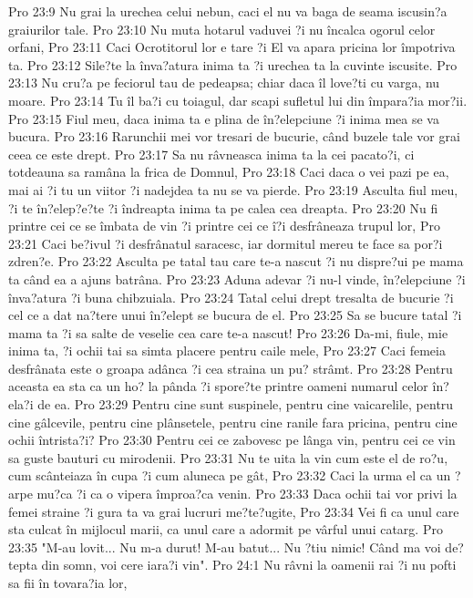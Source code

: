 Pro 23:9  Nu grai la urechea celui nebun, caci el nu va baga de seama iscusin?a graiurilor tale.
Pro 23:10  Nu muta hotarul vaduvei ?i nu încalca ogorul celor orfani,
Pro 23:11  Caci Ocrotitorul lor e tare ?i El va apara pricina lor împotriva ta.
Pro 23:12  Sile?te la înva?atura inima ta ?i urechea ta la cuvinte iscusite.
Pro 23:13  Nu cru?a pe feciorul tau de pedeapsa; chiar daca îl love?ti cu varga, nu moare.
Pro 23:14  Tu îl ba?i cu toiagul, dar scapi sufletul lui din împara?ia mor?ii.
Pro 23:15  Fiul meu, daca inima ta e plina de în?elepciune ?i inima mea se va bucura.
Pro 23:16  Rarunchii mei vor tresari de bucurie, când buzele tale vor grai ceea ce este drept.
Pro 23:17  Sa nu râvneasca inima ta la cei pacato?i, ci totdeauna sa ramâna la frica de Domnul,
Pro 23:18  Caci daca o vei pazi pe ea, mai ai ?i tu un viitor ?i nadejdea ta nu se va pierde.
Pro 23:19  Asculta fiul meu, ?i te în?elep?e?te ?i îndreapta inima ta pe calea cea dreapta.
Pro 23:20  Nu fi printre cei ce se îmbata de vin ?i printre cei ce î?i desfrâneaza trupul lor,
Pro 23:21  Caci be?ivul ?i desfrânatul saracesc, iar dormitul mereu te face sa por?i zdren?e.
Pro 23:22  Asculta pe tatal tau care te-a nascut ?i nu dispre?ui pe mama ta când ea a ajuns batrâna.
Pro 23:23  Aduna adevar ?i nu-l vinde, în?elepciune ?i înva?atura ?i buna chibzuiala.
Pro 23:24  Tatal celui drept tresalta de bucurie ?i cel ce a dat na?tere unui în?elept se bucura de el.
Pro 23:25  Sa se bucure tatal ?i mama ta ?i sa salte de veselie cea care te-a nascut!
Pro 23:26  Da-mi, fiule, mie inima ta, ?i ochii tai sa simta placere pentru caile mele,
Pro 23:27  Caci femeia desfrânata este o groapa adânca ?i cea straina un pu? strâmt.
Pro 23:28  Pentru aceasta ea sta ca un ho? la pânda ?i spore?te printre oameni numarul celor în?ela?i de ea.
Pro 23:29  Pentru cine sunt suspinele, pentru cine vaicarelile, pentru cine gâlcevile, pentru cine plânsetele, pentru cine ranile fara pricina, pentru cine ochii întrista?i?
Pro 23:30  Pentru cei ce zabovesc pe lânga vin, pentru cei ce vin sa guste bauturi cu mirodenii.
Pro 23:31  Nu te uita la vin cum este el de ro?u, cum scânteiaza în cupa ?i cum aluneca pe gât,
Pro 23:32  Caci la urma el ca un ?arpe mu?ca ?i ca o vipera împroa?ca venin.
Pro 23:33  Daca ochii tai vor privi la femei straine ?i gura ta va grai lucruri me?te?ugite,
Pro 23:34  Vei fi ca unul care sta culcat în mijlocul marii, ca unul care a adormit pe vârful unui catarg.
Pro 23:35  "M-au lovit... Nu m-a durut! M-au batut... Nu ?tiu nimic! Când ma voi de?tepta din somn, voi cere iara?i vin".
Pro 24:1  Nu râvni la oamenii rai ?i nu pofti sa fii în tovara?ia lor,
